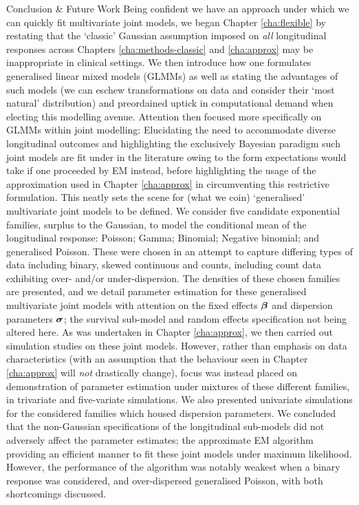 \begin{chapter}{\label{cha:conclusion}Conclusion \& Future Work}
Being confident we have an approach under which we can quickly fit multivariate joint models, we began Chapter \ref{cha:flexible} by restating that the `classic' Gaussian assumption imposed on \textit{all} longitudinal responses across Chapters \ref{cha:methods-classic} and \ref{cha:approx} may be inappropriate in clinical settings. We then introduce how one formulates generalised linear mixed models (GLMMs) as well as stating the advantages of such models (\eg we can eschew transformations on data and consider their `most natural' distribution) and preordained uptick in computational demand when electing this modelling avenue.\newline
Attention then focused more specifically on GLMMs within joint modelling: Elucidating the need to accommodate diverse longitudinal outcomes and highlighting the exclusively Bayesian paradigm such joint models are fit under in the literature owing to the form expectations would take if one proceeded by \eg EM instead, before highlighting the usage of the approximation used in Chapter \ref{cha:approx} in circumventing this restrictive formulation. This neatly sets the scene for (what we coin) `generalised' multivariate joint models to be defined.\newline
We consider five candidate exponential families, surplus to the Gaussian, to model the conditional mean of the longitudinal response: Poisson; Gamma; Binomial; Negative binomial; and generalised Poisson. These were chosen in an attempt to capture differing types of data including binary, skewed continuous and counts, including count data exhibiting over- and/or under-dispersion. The densities of these chosen families are presented, and we detail parameter estimation for these generalised multivariate joint models with attention on the fixed effects $\bm{\beta}$ and dispersion parameters $\bm{\sigma}$; the survival sub-model and random effects specification not being altered here.\newline
As was undertaken in Chapter \ref{cha:approx}, we then carried out simulation studies on these joint models. However, rather than emphasis on data characteristics (with an assumption that the behaviour seen in Chapter \ref{cha:approx} will \textit{not} drastically change), focus was instead placed on demonstration of parameter estimation under mixtures of these different families, in trivariate and five-variate simulations. We also presented univariate simulations for the considered families which housed dispersion parameters. We concluded that the non-Gaussian specifications of the longitudinal sub-models did not adversely affect the parameter estimates; the approximate EM algorithm providing an efficient manner to fit these joint models under maximum likelihood. However, the performance of the algorithm was notably weakest when a binary response was considered, and over-dispersed generalised Poisson, with both shortcomings discussed.\newline 

\end{chapter}
